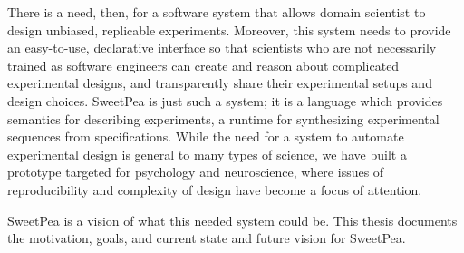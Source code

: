 There is a need, then, for a software system that allows domain scientist to design unbiased, replicable experiments. Moreover, this system needs to provide an easy-to-use, declarative interface so that scientists who are not necessarily trained as software engineers can create and reason about complicated experimental designs, and transparently share their experimental setups and design choices. SweetPea is just such a system; it is a language which provides semantics for describing experiments, a runtime for synthesizing experimental sequences from specifications. While the need for a system to automate experimental design is general to many types of science, we have built a prototype targeted for psychology and neuroscience, where issues of reproducibility and complexity of design have become a focus of attention.

SweetPea is a vision of what this needed system could be. This thesis documents the motivation, goals, and current state and future vision for SweetPea.




